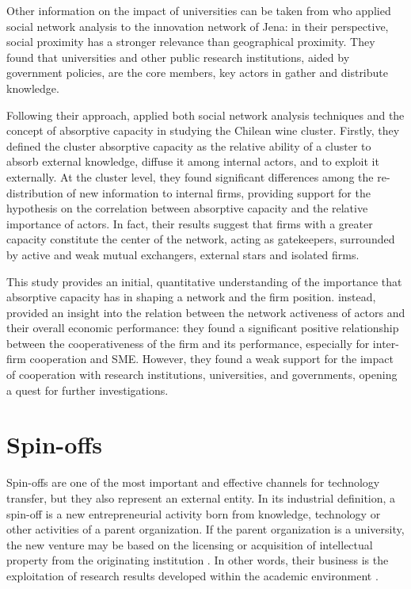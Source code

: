 Other information on the impact of universities can be taken from \citet{Cantner2006} who applied social network analysis to the innovation network of Jena: in their perspective, social proximity has a stronger relevance than geographical proximity. They found that universities and other public research institutions, aided by government policies, are the core members, key actors in gather and distribute knowledge.

Following their approach, \citet{Giuliani2005} applied both social network analysis techniques and the concept of absorptive capacity in studying the Chilean wine cluster. Firstly, they defined the cluster absorptive capacity as the relative ability of a cluster to absorb external knowledge, diffuse it among internal actors, and to exploit it externally. At the cluster level, they found significant differences among the re-distribution of new information to internal firms, providing support for the hypothesis on the correlation between absorptive capacity and the relative importance of actors. In fact, their results suggest that firms with a greater capacity constitute the center of the network, acting as gatekeepers, surrounded by active and weak mutual exchangers, external stars and isolated firms.

This study provides an initial, quantitative understanding of the importance that absorptive capacity has in shaping a network and the firm position. \citet{Zeng2010} instead, provided an insight into the relation between the network activeness of actors and their overall economic performance: they found a significant positive relationship between the cooperativeness of the firm and its performance, especially for inter-firm cooperation and SME. However, they found a weak support for the impact of cooperation with research institutions, universities, and governments, opening a quest for further investigations.


\section{Spin-offs}

Spin-offs are one of the most important and effective channels for technology transfer, but they also represent an external entity. In its industrial definition, a spin-off is a new entrepreneurial activity born from knowledge, technology or other activities of a parent organization. If the parent organization is a university, the new venture may be based on the licensing or acquisition of intellectual property from the originating institution \citep{Lockett2005a}. In other words, their business is the exploitation of research results developed within the academic environment \citep{Rizzo2015}.

